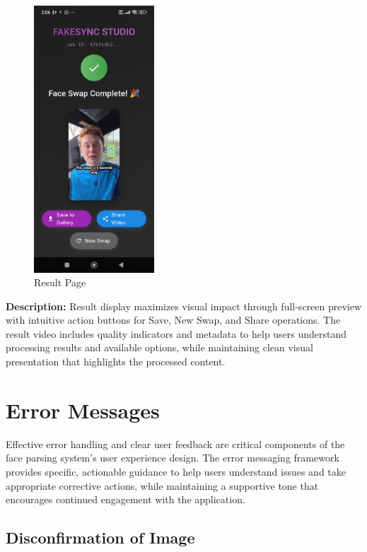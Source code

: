 \documentclass[12pt,a4paper]{report}
\begin{document}
\begin{figure}[H]
\centering
\includegraphics[width=0.4\textwidth]{figures/result_page.png}
\caption{Result Page}
\label{fig:result_page}
\end{figure}

\textbf{Description:} Result display maximizes visual impact through full-screen preview with intuitive action buttons for Save, New Swap, and Share operations. The result video includes quality indicators and metadata to help users understand processing results and available options, while maintaining clean visual presentation that highlights the processed content.

\section{Error Messages}

Effective error handling and clear user feedback are critical components of the face parsing system's user experience design. The error messaging framework provides specific, actionable guidance to help users understand issues and take appropriate corrective actions, while maintaining a supportive tone that encourages continued engagement with the application.

\subsection{Disconfirmation of Image}
\end{document}
